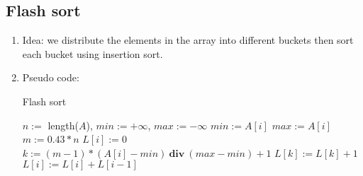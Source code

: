 \documentclass[12pt]{article}
\begin{document}
    \subsection{Flash sort}
    \begin{enumerate}
        \item Idea: we distribute the elements in the array into different buckets then sort each bucket using insertion sort.
        \item Pseudo code:
        \begin{algorithm}[H]
            \caption{Flash sort}
            \begin{algorithmic}[1]
                    \State $n:=$ length($A$), $\textit{min}:=+\infty$, $\textit{max}:=-\infty$
                            \State $\textit{min}:=A[i]$
                        \EndIf
                            \State $\textit{max}:=A[i]$
                        \EndIf
                    \EndFor 
                    \State $m:=0.43*n$
                    \State $L[i]:=0$
                    \EndFor
                    \State $k:=(m-1)*(A[i]-\textit{min})\ \textbf{div}\ (\textit{max}-\textit{min})+1$
                    \State $L[k]:=L[k]+1$
                    \EndFor
                    \State $L[i]:=L[i]+L[i-1]$
                    \EndFor
            \end{algorithmic}
        \end{algorithm}
        

\end{enumerate}
\end{document}
